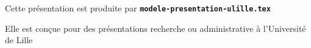   \item Cette présentation est produite par \texttt{\textbf{modele-presentation-ulille.tex}}
  \item Elle est conçue pour des présentations recherche ou administrative à l'Université de Lille

